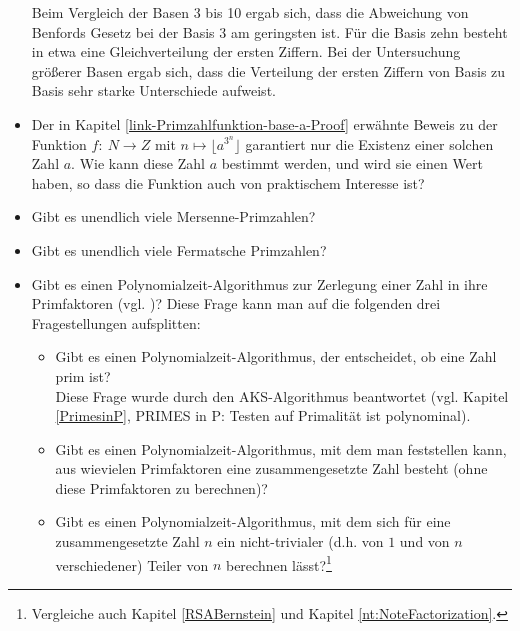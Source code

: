\begin{refsegment}
\begin{itemize}
     Beim Vergleich der Basen 3 bis 10 ergab sich, dass die Abweichung von
     Benfords Gesetz bei der Basis 3 am geringsten ist. Für die Basis zehn
     besteht in etwa eine Gleichverteilung der ersten Ziffern. Bei der
     Untersuchung größerer Basen ergab sich, dass die Verteilung der ersten
     Ziffern von Basis zu Basis sehr starke Unterschiede aufweist.



\item %
      \label{link-Primzahlfunktion-base-a-Offen}
    Der in Kapitel \ref{link-Primzahlfunktion-base-a-Proof} erwähnte Beweis zu
    der Funktion  $f: \: N \rightarrow Z$ mit $n \mapsto \lfloor a^{3^n}\rfloor$
    garantiert nur die Existenz einer
    solchen Zahl $a$.  Wie kann diese Zahl $a$ bestimmt werden, und wird sie
    einen Wert haben, so dass die Funktion auch von praktischem Interesse ist?


\item Gibt es unendlich viele Mersenne-Primzahlen?

\item Gibt es unendlich viele Fermatsche Primzahlen?


\item Gibt es einen Polynomialzeit-Algorithmus zur
   Zerlegung einer Zahl in ihre Primfaktoren (vgl. \cite[S. 167]{Klee1997})?
   Diese Frage kann man auf die folgenden drei Fragestellungen aufsplitten:
   \begin{itemize}
        \item Gibt es einen Polynomialzeit-Algorithmus, der entscheidet, ob
	   eine Zahl prim ist? \\
	   Diese Frage wurde durch den AKS-Algorithmus
	   beantwortet (vgl.  Kapitel \ref{PrimesinP}, \glqq PRIMES in P\grqq:
	   Testen auf Primalität ist polynominal).
        \item Gibt es einen Polynomialzeit-Algorithmus, mit dem man
           feststellen kann, aus wievielen Primfaktoren eine zusammengesetzte
           Zahl besteht (ohne diese Primfaktoren zu berechnen)?
        \item Gibt es einen Polynomialzeit-Algorithmus, mit dem sich für
	   eine zusammengesetzte Zahl $n$ ein nicht-trivialer (d.h.
	   von $1$ und von $n$ verschiedener) Teiler von $n$ berechnen
	   lässt?\footnote{Vergleiche auch Kapitel \ref{RSABernstein}
	   und Kapitel \ref{nt:NoteFactorization}.}
   \end{itemize}


\end{itemize}
\end{refsegment}
